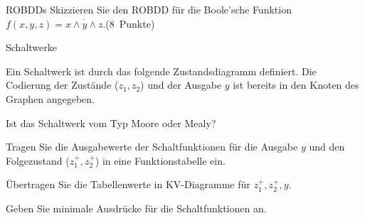 \documentclass{exercisesheet}
\begin{document}
\begin{exercise}{ROBDDs}
  Skizzieren Sie den ROBDD für die Boole’sche Funktion $f (x, y, z) = \overline{x \land y \land z}$.\hfill (8~Punkte)

  \begin{solution}
  \end{solution}
\end{exercise}

\begin{eexercises}{Schaltwerke}{
    Ein Schaltwerk ist durch das folgende Zustandsdiagramm definiert. Die Codierung der Zustände ($z_1, z_2$) und der Ausgabe $y$ ist bereits in den Knoten des Graphen angegeben.\par
    \centering
  }
  \item Ist das Schaltwerk vom Typ Moore oder Mealy?\points
  \item Tragen Sie die Ausgabewerte der Schaltfunktionen für die Ausgabe $y$ und den Folgezustand ($z_1^+, z_2^+$) in eine Funktionstabelle ein.\points[2]
  \item Übertragen Sie die Tabellenwerte in KV-Diagramme für $z_1^+, z_2^+, y$.\points[3]
  \item Geben Sie minimale Ausdrücke für die Schaltfunktionen an.\points[4]
\end{eexercises}
\end{document}
